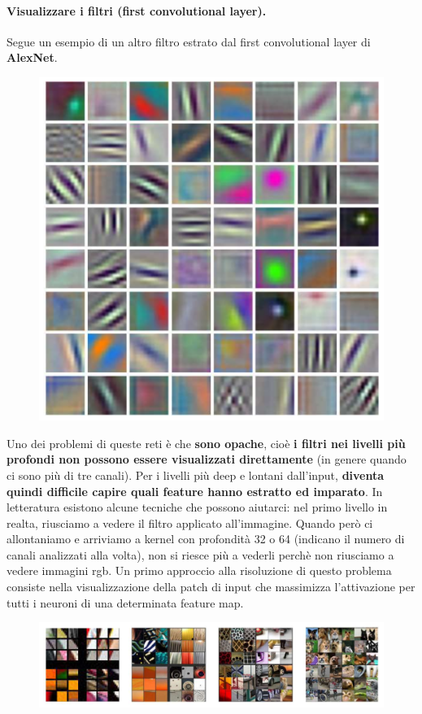 \paragraph{Visualizzare i filtri (first convolutional layer).} Segue un esempio di un altro filtro estrato dal first convolutional layer di \textbf{AlexNet}.
\begin{figure}[!h]
    \includegraphics[scale=.3]{images/cnn/alexnet.png}
    \centering
\end{figure}



Uno dei problemi di queste reti è che \textbf{sono opache}, cioè \textbf{i filtri nei livelli più profondi non possono essere visualizzati direttamente} (in genere quando ci sono più di tre canali). Per i livelli più deep e lontani dall'input, \textbf{diventa quindi difficile capire quali feature hanno estratto ed imparato}. In letteratura esistono alcune tecniche che possono aiutarci: nel primo livello in realta, riusciamo a vedere il filtro applicato all'immagine. Quando però ci allontaniamo e arriviamo a kernel con profondità 32 o 64 (indicano il numero di canali analizzati alla volta), non si riesce più a vederli perchè non riusciamo a vedere immagini rgb. Un primo approccio alla risoluzione di questo problema consiste nella visualizzazione della patch di input che massimizza l'attivazione per tutti i neuroni di una determinata feature map.
\begin{figure}[!h]
    \includegraphics[scale=.3]{images/cnn/filters02.png}
    \centering
\end{figure}



